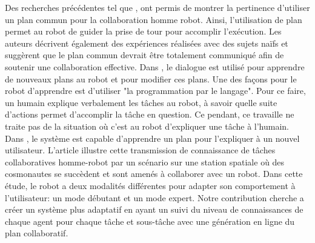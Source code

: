 \documentclass[a4paper,11pt,twoside]{StyleThese}
\begin{document}
Des recherches précédentes tel que \cite{Lallee2013}, ont permis de montrer la pertinence d'utiliser un plan commun pour la collaboration homme robot. Ainsi, l'utilisation de plan permet au robot de guider la prise de tour pour accomplir l'exécution. Les auteurs décrivent également des expériences réalisées avec des sujets naïfs et suggèrent que le plan commun devrait être totalement communiqué afin de soutenir une collaboration effective. Dans \cite{Petit2012}, le dialogue est utilisé pour apprendre de nouveaux plans au robot et pour modifier ces plans. Une des façons pour le robot d'apprendre est d'utiliser "la programmation par le langage". Pour ce faire, un humain explique verbalement les tâches au robot, à savoir quelle suite d'actions permet d'accomplir la tâche en question. Ce pendant, ce travaille ne traite pas de la situation où c'est au robot d'expliquer une tâche à l'humain.
Dans \cite{Sorce2015}, le système est capable d'apprendre un plan pour l'expliquer à un nouvel utilisateur. L'article illustre cette transmission de connaissance de tâches collaboratives homme-robot par un scénario sur une station spatiale où des cosmonautes se succèdent et sont amenés à collaborer avec un robot. Dans cette étude, le robot a deux modalités différentes pour adapter son comportement à l'utilisateur: un mode débutant et un mode expert.
Notre contribution cherche a créer un système plus adaptatif en ayant un suivi du niveau de connaissances de chaque agent pour chaque tâche et sous-tâche avec une génération en ligne du plan collaboratif.


\end{document}
